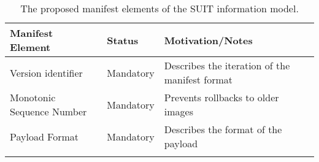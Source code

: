 \documentclass[0-thesis.tex]{subfiles}
\begin{document}
\begin{longtable}[]{@{}lll@{}}
    \caption{The proposed manifest elements of the SUIT information model.}
    \label{tab:manifest-elements}\\
    \toprule
    \begin{minipage}[b]{0.23\columnwidth}\raggedright\strut
    Manifest Element\strut
    \end{minipage} & \begin{minipage}[b]{0.26\columnwidth}\raggedright\strut
    Status\strut
    \end{minipage} & \begin{minipage}[b]{0.60\columnwidth}\raggedright\strut
    Motivation/Notes\strut
    \end{minipage}\tabularnewline
    \midrule
    \endhead
    \begin{minipage}[t]{0.23\columnwidth}\raggedright\strut
    Version identifier\strut
    \end{minipage} & \begin{minipage}[t]{0.26\columnwidth}\raggedright\strut
    Mandatory\strut
    \end{minipage} & \begin{minipage}[t]{0.60\columnwidth}\raggedright\strut
    Describes the iteration of the manifest format\strut
    \end{minipage}\tabularnewline
    \begin{minipage}[t]{0.23\columnwidth}\raggedright\strut
    Monotonic Sequence Number\strut
    \end{minipage} & \begin{minipage}[t]{0.26\columnwidth}\raggedright\strut
    Mandatory\strut
    \end{minipage} & \begin{minipage}[t]{0.60\columnwidth}\raggedright\strut
    Prevents rollbacks to older images\strut
    \end{minipage}\tabularnewline
    \begin{minipage}[t]{0.23\columnwidth}\raggedright\strut
    Payload Format\strut
    \end{minipage} & \begin{minipage}[t]{0.26\columnwidth}\raggedright\strut
    Mandatory\strut
    \end{minipage} & \begin{minipage}[t]{0.60\columnwidth}\raggedright\strut
    Describes the format of the payload\strut
    \end{minipage}\tabularnewline
    \begin{minipage}[t]{0.23\columnwidth}\raggedright\strut

\end{minipage}
\end{longtable}
\end{document}
